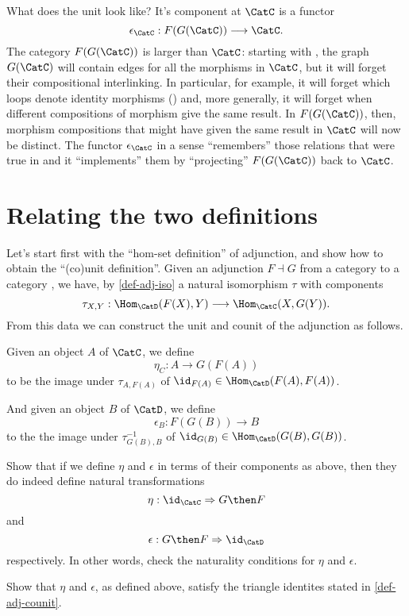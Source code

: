 What does the unit look like? It's component at $\CatC$ is a functor
$$
\epsilon_{\CatC} : F(G(\CatC)) \longrightarrow \CatC. 
$$
The category $F(G(\CatC))$ is larger than $\CatC$: starting with \CatC, the graph $G(\CatC)$ will contain edges for all the morphisms in $\CatC$, but it will forget their compositional interlinking. In particular, for example, it will forget which loops denote identity morphisms () and, more generally, it will forget when different compositions of morphism give the same result. In $F(G(\CatC))$, then, morphism compositions that might have given the same result in $\CatC$ will now be distinct. 
The functor $\epsilon_{\CatC}$ in a sense ``remembers'' those relations that were true in \CatC and it ``implements'' them by ``projecting'' $F(G(\CatC))$ back to  $\CatC$. 
 



\section{Relating the two definitions}\label{relate-adj-defs}

Let's start first with the ``hom-set definition'' of adjunction, and show how to obtain the ``(co)unit definition''. 
Given an adjunction $F \dashv G$ from a category \CatC to a category \CatD, we have, by \cref{def-adj-iso} a natural isomorphism $\tau$ with components
$$\tau_{X,Y} : \Hom_{\CatD}(F(X) ,Y ) \longrightarrow \Hom_{\CatC}(X , G(Y) ).$$
From this data we can construct the unit and counit of the adjunction as follows. 

Given an object $A$ of $\CatC$, we define 
$$
\eta_C : A \rightarrow G(F(A)) 
$$
to be the image under $\tau_{A, F(A)}$ of $\id_{F(A)} \in \Hom_{\CatD}(F (A) , F(A) )$. 

And given an object $B$ of $\CatD$, we define 
$$
\epsilon_B : F(G(B)) \rightarrow B
$$
to the the image under $\tau_{G(B), B}^{-1}$ of $\id_{G(B)} \in \Hom_{\CatD}(G(B), G(B))$. 

\begin{exercise}
Show that if we define $\eta$ and $\epsilon$ in terms of their components as above, then they do indeed define natural transformations 
$$
\eta: \id_{\CatC} \Rightarrow G\then F
$$
and
$$
\epsilon: G \then F \Rightarrow \id_{\CatD}
$$
respectively. In other words, check the naturality conditions for $\eta$ and $\epsilon$. 
\end{exercise}

\begin{exercise}
Show that $\eta$ and $\epsilon$, as defined above, satisfy the triangle identites stated in \cref{def-adj-counit}.
 \end{exercise}


